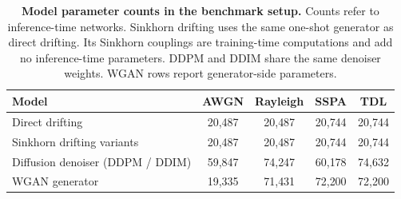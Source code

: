\begin{table}[t]
\centering
\caption{\textbf{Model parameter counts in the benchmark setup.} Counts refer to inference-time networks. Sinkhorn drifting uses the same one-shot generator as direct drifting. Its Sinkhorn couplings are training-time computations and add no inference-time parameters. DDPM and DDIM share the same denoiser weights. WGAN rows report generator-side parameters.}
\label{tab:model-size}
\tablefontsize
\begin{tabular}{@{}lcccc@{}}
\toprule
Model & AWGN & Rayleigh & SSPA & TDL \\
\midrule
Direct drifting & 20{,}487 & 20{,}487 & 20{,}744 & 20{,}744 \\
Sinkhorn drifting variants & 20{,}487 & 20{,}487 & 20{,}744 & 20{,}744 \\
Diffusion denoiser (DDPM / DDIM) & 59{,}847 & 74{,}247 & 60{,}178 & 74{,}632 \\
WGAN generator & 19{,}335 & 71{,}431 & 72{,}200 & 72{,}200 \\
\bottomrule
\end{tabular}
\end{table}
